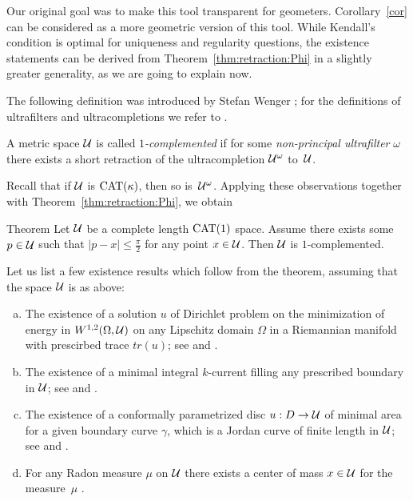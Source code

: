 \documentclass[oneside,a4paper, 12pt]{article}
\begin{document}
Our original goal was to make this tool transparent for geometers.
Corollary~\ref{cor} can be considered as a more geometric version of this tool.
While Kendall's condition is optimal for uniqueness and regularity questions, the existence statements can be derived from Theorem~\ref{thm:retraction:Phi} in a
slightly greater generality, as  we are going to explain now.

The following definition was introduced by Stefan Wenger \cite{Wenger-1comp};
for the definitions of ultrafilters and ultracompletions we refer to \cite{Wenger-1comp,guo-wenger,akp}.

A metric space ${\mathcal{U}}$ is called \emph{$1$-complemented} if for some \emph{non-principal ultrafilter} $\omega$  there exists a short retraction of the ultracompletion ${\mathcal{U}}^{\omega}$ to~${\mathcal{U}}$.

Recall that if ${\mathcal{U}}$ is $\mathrm{CAT}(\kappa)$, then so is~${\mathcal{U}}^\omega$. 
Applying these observations together with Theorem~\ref{thm:retraction:Phi}, we obtain

\begin{thm}{Theorem}\label{thm:complemented}
Let ${\mathcal{U}}$ be a complete length $\mathrm{CAT}(1)$ space.
Assume  there exists some $p\in {\mathcal{U}}$ such that $|p-x|\le \tfrac\pi2$ for any point $x\in {\mathcal{U}}$.
Then ${\mathcal{U}}$ is $1$-complemented.
\end{thm}

Let us list a few existence results which follow from the theorem, assuming that the space ${\mathcal{U}}$ is as above:
\begin{enumerate}[(a)]
\item\label{dirichlet}   The existence of a solution $u$ of Dirichlet problem on the minimization of energy 
in $W^{1,2} (\Omega, {\mathcal{U}})$ on any Lipschitz domain $\Omega$ in a Riemannian manifold with prescirbed trace $tr(u)$; see \cite{KS} and \cite[Theorem 1.4]{guo-wenger}.
\item The existence of a minimal integral $k$-current filling any prescribed boundary in ${\mathcal{U}}$; 
see \cite{Ambrosio} and \cite[Theorem 3.3]{Wenger-1comp}.
\item   The existence of a conformally parametrized disc $u:D\to {\mathcal{U}}$ of minimal area for a given boundary curve $\gamma$, which is a Jordan curve of finite length in ${\mathcal{U}}$;
see \cite{LWplateau} and \cite[Theorem 1.2]{guo-wenger}.
\item\label{center} For any Radon measure $\mu$ on ${\mathcal{U}}$ there exists a center of mass $x\in {\mathcal{U}}$ for the measure~$\mu$ \cite{Sturm, yokota}.
\end{enumerate}
\end{document}
